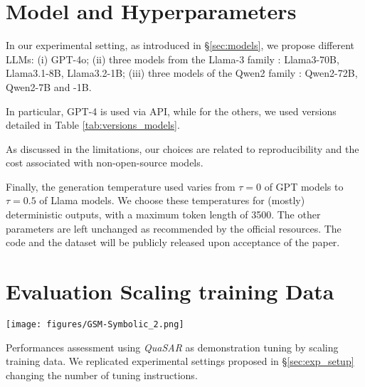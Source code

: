 \documentclass[11pt]{article}
\newcommand{\QuaSAR}{\emph{QuaSAR}\xspace}
\begin{document}
\begin{table}[]
\section{Model and Hyperparameters}
\label{app:model_info}

In our experimental setting, as introduced in \S \ref{sec:models}, we propose different LLMs: (i) GPT-4o; (ii) three models from the Llama-3 family \cite{grattafiori2024llama3herdmodels}: Llama3-70B, Llama3.1-8B, Llama3.2-1B; (iii) three models of the Qwen2 family \cite{yang2024qwen2}: Qwen2-72B, Qwen2-7B and -1B.

In particular, GPT-4 is used via API, while for the others, we used versions detailed in Table \ref{tab:versions_models}.

As discussed in the limitations, our choices are related to reproducibility and the cost associated with non-open-source models.

Finally, the generation temperature used varies from $\tau = 0$ of GPT models to $\tau = 0.5$ of Llama models. We choose these temperatures for (mostly) deterministic outputs, with a maximum token length of 3500. The other parameters are left unchanged as recommended by the official resources. The code and the dataset will be publicly released upon acceptance of the paper.     
\end{table}


\begin{table}[]
\section{Evaluation Scaling training Data}
\label{app:scaling_data_additional}
    \centering
    \texttt{[image: figures/GSM-Symbolic\_2.png]}
    \caption{Performances assessment using \QuaSAR as demonstration tuning by scaling training data. We replicated experimental settings proposed in \S \ref{sec:exp_setup} changing the number of tuning instructions.}
    \label{fig:scaling_training_data_smaller}

\end{table}
\end{document}
